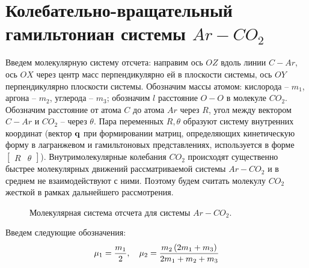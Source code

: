 \section{Колебательно-вращательный гамильтониан системы $Ar-CO_2$}

Введем молекулярную систему отсчета: направим ось $OZ$ вдоль линии $C-Ar$, ось $OX$ через центр масс перпендикулярно ей в плоскости системы, ось $OY$ перпендикулярно плоскости системы. Обозначим массы атомом: кислорода -- $m_1$, аргона -- $m_2$, углерода -- $m_3$; обозначим $l$ расстояние $O-O$ в молекуле $CO_2$. Обозначим расстояние от атома $C$ до атома $Ar$ через $R$, угол между вектором $C-Ar$ и $CO_2$ -- через $\theta$. Пара переменных $R, \theta$ образуют систему внутренних координат (вектор $\mathbf{q}$ при формировании матриц, определяющих кинетическую форму в лагранжевом и гамильтоновых представлениях, используется в форме $\begin{bmatrix} R & \theta \end{bmatrix}$). Внутримолекулярные колебания $CO_2$ происходят существенно быстрее молекулярных движений рассматриваемой системы $Ar-CO_2$ и в среднем не взаимодействуют с ними. Поэтому будем считать молекулу $CO_2$ жесткой в рамках дальнейшего рассмотрения.  
\begin{figure}[h]
\centering
{}
\caption{Молекулярная система отсчета для системы $Ar-CO_2$.}
\end{figure}

Введем следующие обозначения:
\vverh
\begin{gather}
	\mu_1 = \frac{m_1}{2}, \quad 
	\mu_2 = \frac{m_2 \left( 2 m_1 + m_3 \right)}{2 m_1 + m_2 + m_3} \notag
\end{gather}

